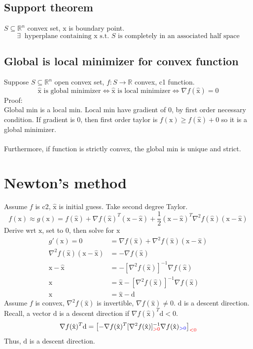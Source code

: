 \documentclass[6pt]{article}
\def\x{\textrm{x}}
\def\xh{\hat{\textrm{x}}}
\def\d{\textrm{d}}
\begin{document}
\subsection{Support theorem}
$S\subseteq \mathbb{R}^n$ convex set, $\x$ is boundary point.
$$\exists~ \textrm{ hyperplane containing }\x \textrm{ s.t. } S \textrm{ is completely in an associated half space}$$

\subsection{Global is local minimizer for convex function}
Suppose $S\subseteq \mathbb{R}^n$ open convex set, $f:S\to\mathbb{R}$ convex, c1 function.
$$\hat{\x} \textrm{ is global minimizer}\Longleftrightarrow \hat{\x} \textrm{ is local minimizer} \Longleftrightarrow \nabla f(\hat{\x})=0$$
Proof:\\
Global min is a local min. Local min have gradient of 0, by first order necessary condition. If gradient is 0, then first order taylor is $f(\x)\geq f(\xh)+0$ so it is a global minimizer.\\\\
Furthermore, if function is strictly convex, the global min is unique and strict.

\section{Newton's method}
Assume $f$ is c2, $\xh$ is initial guess. Take second degree Taylor.
$$f(\x) \approx g(\x) = f(\xh) + \nabla f(\xh)^T(\x-\xh) + \frac{1}{2}(\x-\xh)^T\nabla^2 f(\xh)(\x-\xh)$$
Derive wrt $\x$, set to 0, then solve for $\x$
\begin{align*}
  g'(\x) = 0 &= \nabla f(\xh) + \nabla^2 f(\xh)(\x-\xh)\\
  \nabla^2 f(\xh)(\x-\xh) &= -\nabla f(\xh)\\
    \x-\xh &= -[\nabla^2 f(\xh)]^{-1}\nabla f(\xh)\\
    \x &= \xh - [\nabla^2 f(\xh)]^{-1} \nabla f(\xh)\\
    \x &= \xh - \d
\end{align*}
Assume $f$ is convex, $\nabla^2f(\xh)$ is invertible, $\nabla f(\xh) \neq 0$. $\d$ is a descent direction.\\
Recall, a vector $\d$ is a descent direction if $\nabla f(\xh)^T \d < 0$.
$$\nabla f(\xh)^T \d  = \left[-\nabla f(\xh)^T[\nabla^2 f(\xh)]^{-1}_{\color{red}>0} \nabla f(\xh)_{\color{blue}>0}\right]_{\color{red}<0}$$
Thus, $\d$ is a descent direction.
\end{document}
